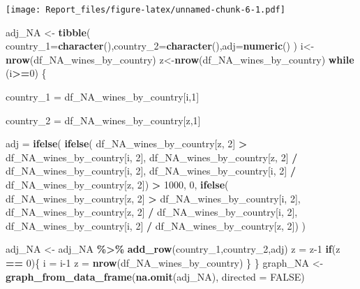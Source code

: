 \documentclass[
]{article}
\newenvironment{Shaded}{\begin{snugshade}}{\end{snugshade}}
\newcommand{\AttributeTok}[1]{\textcolor[rgb]{0.13,0.29,0.53}{#1}}
\newcommand{\ConstantTok}[1]{\textcolor[rgb]{0.56,0.35,0.01}{#1}}
\newcommand{\ControlFlowTok}[1]{\textcolor[rgb]{0.13,0.29,0.53}{\textbf{#1}}}
\newcommand{\DecValTok}[1]{\textcolor[rgb]{0.00,0.00,0.81}{#1}}
\newcommand{\FunctionTok}[1]{\textcolor[rgb]{0.13,0.29,0.53}{\textbf{#1}}}
\newcommand{\NormalTok}[1]{#1}
\newcommand{\OtherTok}[1]{\textcolor[rgb]{0.56,0.35,0.01}{#1}}
\newcommand{\SpecialCharTok}[1]{\textcolor[rgb]{0.81,0.36,0.00}{\textbf{#1}}}
\begin{document}
\texttt{[image: Report\_files/figure-latex/unnamed-chunk-6-1.pdf]}

\begin{Shaded}
\begin{Highlighting}[]
\NormalTok{adj\_NA }\OtherTok{\textless{}{-}} \FunctionTok{tibble}\NormalTok{( }\AttributeTok{country\_1=}\FunctionTok{character}\NormalTok{(),}\AttributeTok{country\_2=}\FunctionTok{character}\NormalTok{(),}\AttributeTok{adj=}\FunctionTok{numeric}\NormalTok{()}
\NormalTok{)}
\NormalTok{i}\OtherTok{\textless{}{-}}\FunctionTok{nrow}\NormalTok{(df\_NA\_wines\_by\_country)}
\NormalTok{z}\OtherTok{\textless{}{-}}\FunctionTok{nrow}\NormalTok{(df\_NA\_wines\_by\_country)}
\ControlFlowTok{while}\NormalTok{ (i}\SpecialCharTok{\textgreater{}=}\DecValTok{0}\NormalTok{) \{}
  
  
\NormalTok{    country\_1 }\OtherTok{=}\NormalTok{ df\_NA\_wines\_by\_country[i,}\DecValTok{1}\NormalTok{]}
    
\NormalTok{    country\_2 }\OtherTok{=}\NormalTok{ df\_NA\_wines\_by\_country[z,}\DecValTok{1}\NormalTok{]}
    
\NormalTok{    adj }\OtherTok{=} 
      \FunctionTok{ifelse}\NormalTok{(      }
        \FunctionTok{ifelse}\NormalTok{(}
\NormalTok{          df\_NA\_wines\_by\_country[z, }\DecValTok{2}\NormalTok{] }\SpecialCharTok{\textgreater{}}\NormalTok{ df\_NA\_wines\_by\_country[i, }\DecValTok{2}\NormalTok{],}
\NormalTok{                 df\_NA\_wines\_by\_country[z, }\DecValTok{2}\NormalTok{] }\SpecialCharTok{/}\NormalTok{ df\_NA\_wines\_by\_country[i, }\DecValTok{2}\NormalTok{],}
\NormalTok{                 df\_NA\_wines\_by\_country[i, }\DecValTok{2}\NormalTok{] }\SpecialCharTok{/}\NormalTok{ df\_NA\_wines\_by\_country[z, }\DecValTok{2}\NormalTok{]) }\SpecialCharTok{\textgreater{}} \DecValTok{1000}\NormalTok{,}
        \DecValTok{0}\NormalTok{, }
        \FunctionTok{ifelse}\NormalTok{(}
\NormalTok{          df\_NA\_wines\_by\_country[z, }\DecValTok{2}\NormalTok{] }\SpecialCharTok{\textgreater{}}\NormalTok{ df\_NA\_wines\_by\_country[i, }\DecValTok{2}\NormalTok{],}
\NormalTok{                 df\_NA\_wines\_by\_country[z, }\DecValTok{2}\NormalTok{] }\SpecialCharTok{/}\NormalTok{ df\_NA\_wines\_by\_country[i, }\DecValTok{2}\NormalTok{],}
\NormalTok{                 df\_NA\_wines\_by\_country[i, }\DecValTok{2}\NormalTok{] }\SpecialCharTok{/}\NormalTok{ df\_NA\_wines\_by\_country[z, }\DecValTok{2}\NormalTok{])}
\NormalTok{      )}
    
 

\NormalTok{adj\_NA }\OtherTok{\textless{}{-}}\NormalTok{ adj\_NA }\SpecialCharTok{\%\textgreater{}\%} \FunctionTok{add\_row}\NormalTok{(country\_1,country\_2,adj)}
\NormalTok{    z }\OtherTok{=}\NormalTok{ z}\DecValTok{{-}1}
  \ControlFlowTok{if}\NormalTok{(z }\SpecialCharTok{==} \DecValTok{0}\NormalTok{)\{}
\NormalTok{    i }\OtherTok{=}\NormalTok{ i}\DecValTok{{-}1}
\NormalTok{    z }\OtherTok{=} \FunctionTok{nrow}\NormalTok{(df\_NA\_wines\_by\_country)}
\NormalTok{  \}}
\NormalTok{\}}
\NormalTok{graph\_NA }\OtherTok{\textless{}{-}} \FunctionTok{graph\_from\_data\_frame}\NormalTok{(}\FunctionTok{na.omit}\NormalTok{(adj\_NA), }\AttributeTok{directed =} \ConstantTok{FALSE}\NormalTok{)}


\end{Highlighting}
\end{Shaded}
\end{document}
